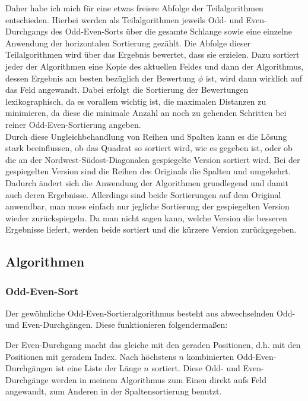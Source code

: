\documentclass[12pt]{article}
\begin{document}
Daher habe ich mich für eine etwas freiere Abfolge der Teilalgorithmen entschieden. Hierbei werden als Teilalgorithmen jeweils Odd- und Even-Durchgangs des Odd-Even-Sorts über die gesamte Schlange sowie eine einzelne Anwendung der horizontalen Sortierung gezählt. Die Abfolge dieser Teilalgorithmen wird über das Ergebnis bewertet, dass sie erzielen. Dazu sortiert jeder der Algorithmen eine Kopie des aktuellen Feldes und dann der Algorithmus, dessen Ergebnis am besten bezüglich der Bewertung $\phi$ ist, wird dann wirklich auf das Feld angewandt. Dabei erfolgt die Sortierung der Bewertungen lexikographisch, da es vorallem wichtig ist, die maximalen Distanzen zu minimieren, da diese die minimale Anzahl an noch zu gehenden Schritten bei reiner Odd-Even-Sortierung angeben.\\

Durch diese Ungleichbehandlung von Reihen und Spalten kann es die Lösung stark beeinflussen, ob das Quadrat so sortiert wird, wie es gegeben ist, oder ob die an der Nordwest-Südost-Diagonalen gespiegelte Version sortiert wird. Bei der gespiegelten Version sind die Reihen des Originals die Spalten und umgekehrt. Dadurch ändert sich die Anwendung der Algorithmen grundlegend und damit auch deren Ergebnisse. Allerdings sind beide Sortierungen auf dem Original anwendbar, man muss einfach nur jegliche Sortierung der gespiegelten Version wieder zurückspiegeln. Da man nicht sagen kann, welche Version die besseren Ergebnisse liefert, werden beide sortiert und die kürzere Version zurückgegeben. 

\subsection{Algorithmen}
\subsubsection{Odd-Even-Sort}
Der gewöhnliche Odd-Even-Sortieralgorithmus besteht aus abwechselnden Odd- und Even-Durchgängen. Diese funktionieren folgendermaßen:
 \begin{algorithmic}
	\EndIf
    \EndFor 
\State {}
\EndProcedure
\end{algorithmic}
Der Even-Durchgang macht das gleiche mit den geraden Positionen, d.h. mit den Positionen mit geradem Index. Nach höchstens $n$ kombinierten Odd-Even-Durchgängen ist eine Liste der Länge $n$ sortiert.\cite{1}  Diese Odd- und Even-Durchgänge werden in meinem Algorithmus zum Einen direkt aufs Feld angewandt, zum Anderen in der Spaltensortierung benutzt.
\end{document}

